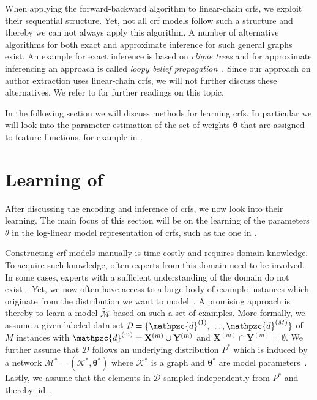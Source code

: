 \bigskip

When applying the forward-backward algorithm to \glspl{linear-chain crf}, we exploit their sequential structure.
Yet, not all \gls{crf} models follow such a structure and thereby we can not always apply this algorithm.
A number of alternative algorithms for both exact and approximate inference for such general graphs exist.
An example for exact inference is based on \textit{clique trees} and for approximate inferencing an approach is called \textit{loopy belief propagation}~\citep{koller2009probabilistic}.
Since our approach on author extraction uses \glspl{linear-chain crf}, we will not further discuss these alternatives.
We refer to \citet{koller2009probabilistic} for further readings on this topic.

\bigskip

In the following section we will discuss methods for learning \glspl{crf}.
In particular we will look into the parameter estimation of the set of weights $\bm{\theta}$ that are assigned to \glspl{feature function}, for example in .

\section{Learning of }\label{sec:learning-crfs}

After discussing the encoding and inference of \glspl{crf}, we now look into their learning.
The main focus of this section will be on the learning of the parameters $\theta$ in the \gls{log-linear model} representation of \glspl{crf}, such as the one in .

\bigskip

Constructing \gls{crf} models manually is time costly and requires domain knowledge.
To acquire such knowledge, often experts from this domain need to be involved.
In some cases, experts with a sufficient understanding of the domain do not exist~\citep{koller2009probabilistic}.
Yet, we now often have access to a large body of example instances which originate from the distribution we want to model~\citep{koller2009probabilistic}.
A promising approach is thereby to learn a model $\mathcal{\tilde{M}}$ based on such a set of examples.
More formally, we assume a given labeled data set $\mathcal{D}=\{\mathpzc{d}^{(1)},\dots,\mathpzc{d}^{(M)}\}$ of $M$ instances with $\mathpzc{d}^{(m)}=\mathbf{X}^{(m)}\cup\mathbf{Y}^{(m)}$ and $\mathbf{X}^{(m)}\cap\mathbf{Y}^{(m)}=\emptyset$.
We further assume that $\mathcal{D}$ follows an underlying distribution $P^*$ which is induced by a network $\mathcal{M}^*=(\mathcal{K}^*,\bm{\theta}^*)$ where $\mathcal{K}^*$ is a graph and $\bm{\theta}^*$ are model parameters~\citep{koller2009probabilistic}.
Lastly, we assume that the elements in $\mathcal{D}$ sampled independently from $P^*$ and thereby \acrfull{iid}~\citep{koller2009probabilistic}.

